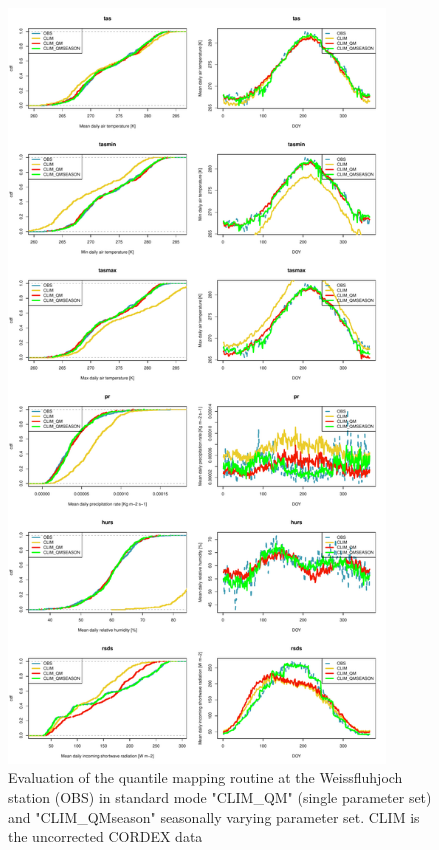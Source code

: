 \documentclass[hess, manuscript]{copernicus}
\begin{document}

\begin{figure}[t]
\includegraphics[width=10cm]{"plots/evalplot_singleModel_season.pdf"}
\caption{ Evaluation of the quantile mapping routine at the Weissfluhjoch station (OBS) in standard mode "CLIM\_QM" (single parameter set) and "CLIM\_QMseason" seasonally varying parameter set. CLIM is the uncorrected CORDEX data  }
\end{figure}
\end{document}

